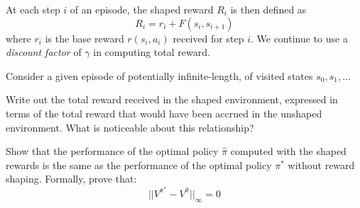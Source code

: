 \documentclass[11pt]{article}
\begin{document}
\noindent At each step $i$ of an episode, the shaped reward $R_i$ is then defined as
$$R_i = r_i + F(s_i,s_{i+1})$$
where $r_i$ is the base reward $r(s_i, a_i)$ received for step $i$. We continue to use a \emph{discount factor} of $\gamma$ in computing total reward.
\newline

 \noindent Consider a given episode of potentially infinite-length, of visited states $s_0, s_1,...$ 

\noindent Write out the total reward received in the shaped environment, expressed in terms of the total reward that would have been accrued in the unshaped environment. What is noticeable about this relationship? 
\newline

 Show that the performance of the optimal policy $\hat \pi$ computed with the shaped rewards is the same as the performance of the optimal policy $\pi^*$ without reward shaping. Formally, prove that:
$$||V^{\pi^*} -V^{\hat \pi}||_{\infty} = 0 $$
\end{document}
